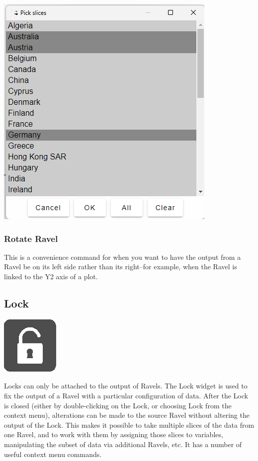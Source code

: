\includegraphics{images/PickSlices}

\subsubsection{Rotate Ravel}

This is a convenience command for when you want to have the output
from a Ravel be on its left side rather than its right--for example,
when the Ravel is linked to the Y2 axis of a plot.

\subsection{Lock}

\label{Lock}

\includegraphics{images/Lock}

Locks can only be attached to the output of Ravels. The Lock widget
is used to fix the output of a Ravel with a particular configuration
of data. After the Lock is closed (either by double-clicking on the
Lock, or choosing Lock from the context menu), alterations can be
made to the source Ravel without altering the output of the Lock.
This makes it possible to take multiple slices of the data from one
Ravel, and to work with them by assigning those slices to variables,
manipulating the subset of data via additional Ravels, etc. It has
a number of useful context menu commands.

